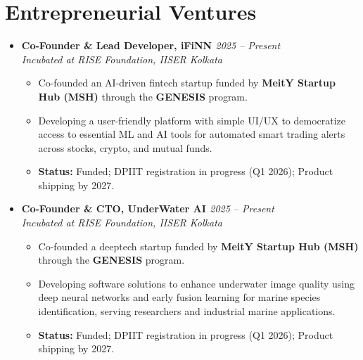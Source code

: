 \documentclass[a4paper,10pt]{article}
\newcommand{\resumeProject}[4]{
    \item\small{
        \textbf{#1} \hfill \textit{#2}\\
        \textit{#3}\\
        \begin{itemize}[leftmargin=1.5em,label=\textbullet,nosep,itemsep=0.5pt]
            #4
        \end{itemize}
    }\vspace{2pt}
}
\newcommand{\compactSection}[2]{
    \section{#1}
    \vspace{-0.1cm}
    #2
    \vspace{-0.2cm}
}
\begin{document}
\compactSection{Entrepreneurial Ventures}{
\begin{itemize}[leftmargin=*,label={},itemsep=4pt]

    \resumeProject{Co-Founder \& Lead Developer, iFiNN \href{https://synapse-iiserk.github.io/}{\faGlobe}}{2025 -- Present}
    {Incubated at RISE Foundation, IISER Kolkata}
    {\item Co-founded an AI-driven fintech startup funded by \textbf{MeitY Startup Hub (MSH)} through the \textbf{GENESIS} program.
    \item Developing a user-friendly platform with simple UI/UX to democratize access to essential ML and AI tools for automated smart trading alerts across stocks, crypto, and mutual funds.
    \item \textbf{Status:} Funded; DPIIT registration in progress (Q1 2026); Product shipping by 2027.}

    \resumeProject{Co-Founder \& CTO, UnderWater AI \href{https://underwater-ai.github.io/}{\faGlobe}}{2025 -- Present}
    {Incubated at RISE Foundation, IISER Kolkata}
    {\item Co-founded a deeptech startup funded by \textbf{MeitY Startup Hub (MSH)} through the \textbf{GENESIS} program.
    \item Developing software solutions to enhance underwater image quality using deep neural networks and early fusion learning for marine species identification, serving researchers and industrial marine applications.
    \item \textbf{Status:} Funded; DPIIT registration in progress (Q1 2026); Product shipping by 2027.}

\end{itemize}
}
\end{document}
